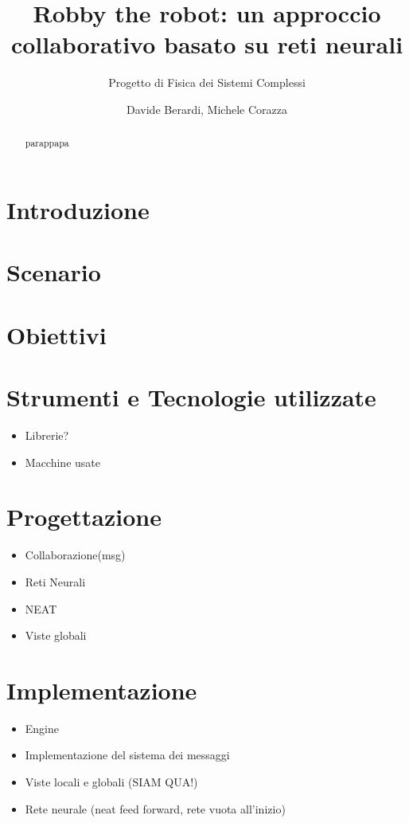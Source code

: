 \documentclass[a4paper,10pt,abstracton]{scrartcl}
\begin{document}
\title{Robby the robot: un approccio collaborativo basato su reti neurali}
\subtitle{Progetto di Fisica dei Sistemi Complessi}

\author{Davide Berardi, Michele Corazza}

\maketitle

\begin{abstract}
parappapa
\end{abstract}

\section{Introduzione}


\section{Scenario}




\section {Obiettivi}



\section{Strumenti e Tecnologie utilizzate}
\begin{itemize}
 \item Librerie?
 \item Macchine usate
\end{itemize}



\section{Progettazione}
\begin{itemize}
 \item Collaborazione(msg)
 \item Reti Neurali
 \item NEAT
 \item Viste globali
\end{itemize}



\section{Implementazione}
\begin{itemize}
 \item Engine
 \item Implementazione del sistema dei messaggi
 \item Viste locali e globali (SIAM QUA!)
 \item Rete neurale (neat feed forward, rete vuota all'inizio)
\end{itemize}

\end{document}
